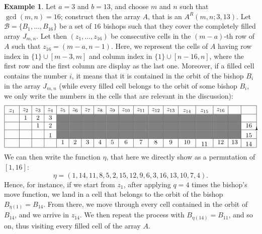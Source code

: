 \documentclass{amsart}
\theoremstyle{definition}
\newtheorem{ex}[prop]{Example}
\numberwithin{equation}{section}
\newcommand\tikzmark[2]{%
\tikz[remember picture,baseline] \node[inner sep=2pt,outer sep=0] (#1){#2};%
}
\newcommand\link[2]{%
\begin{tikzpicture}[remember picture, overlay, >=stealth, shift={(0,0)}]
  \draw[->] (#1) to (#2);
\end{tikzpicture}%
}
\begin{document}
\begin{ex}
Let $a = 3$ and $b=13$, and choose $m$ and $n$ such that $\gcd(m,n) = 16$; construct then the array $A$, that is an $A^{R}(m,n;3,13)$. Let $\mathcal{B} = \{B_1, \dotsc, B_{16}\}$ be a set of $16$ bishops such that they cover the completely filled array $J_{m,n}$. Let then $(z_1,\dotsc,z_{16})$ be consecutive cells in the $(m-a)$-th row of $A$ such that $z_{16} = (m-a,n-1)$. Here, we represent the cells of $A$ having row index in $\{1\} \cup [m-3,m]$ and column index in $\{1\} \cup [n-16,n]$, where the first row and the first column are display as the last one. Moreover, if a filled cell contains the number $i$, it means that it is contained in the orbit of the bishop $B_i$ in the array $J_{m,n}$ (while every filled cell belongs to the orbit of some bishop $B_i$, we only write the numbers in the cells that are relevant in the discussion):
\[
\small{
\begin{array}{|c|c|c|c|c|c|c|c|c|c|c|c|c|c|c|c|c|c|} \hline
\tikzmark{p}{$z_1$}&z_2&z_3&z_4&z_5&z_6&z_7&z_8&z_9&z_{10}&z_{11}&z_{12}&z_{13}&\tikzmark{d}{$z_{14}$}&\tikzmark{e}{$z_{15}$}&z_{16} && \\ \hline
&1&2&3&\cellcolor{gray}&\cellcolor{gray}&\cellcolor{gray}&\cellcolor{gray}&\cellcolor{gray}&\cellcolor{gray}&\cellcolor{gray}&\cellcolor{gray}&\cellcolor{gray}&\cellcolor{gray}&\cellcolor{gray}&\cellcolor{gray}&\cellcolor{gray}& \\ \hline
&&1&2&\cellcolor{gray}&\cellcolor{gray}&\cellcolor{gray}&\cellcolor{gray}&\cellcolor{gray}&\cellcolor{gray}&\cellcolor{gray}&\cellcolor{gray}&\cellcolor{gray}&\cellcolor{gray}&\cellcolor{gray}&\cellcolor{gray}&\cellcolor{gray}&16 \\ \hline
&&&\tikzmark{a}{1}&\cellcolor{gray}&\cellcolor{gray}&\cellcolor{gray}&\cellcolor{gray}&\cellcolor{gray}&\cellcolor{gray}&\cellcolor{gray}&\cellcolor{gray}&\cellcolor{gray}&\cellcolor{gray}&\cellcolor{gray}&\cellcolor{gray}&\cellcolor{gray}& \tikzmark{b}{15} \\ \hline
&&&&1&2&3&4&5&6&7&8&9&10&\tikzmark{f}{11} &12&13&\tikzmark{c}{14} \\ \hline
\end{array}
\link{a}{b}
\link{b}{c}
\link{d}{e}
\link{e}{f}
}
\]
We can then write the function $\eta$, that here we directly show as a permutation of $[1,16]$:
\[
\eta = (1,14,11,8,5,2,15,12,9,6,3,16,13,10,7,4).
\]
Hence, for instance, if we start from $z_1$, after applying $q=4$ times the bishop's move function, we land in a cell that belongs to the orbit of the bishop $B_{\eta(1)} = B_{14}$. From there, we move through every cell contained in the orbit of $B_{14}$, and we arrive in $z_{14}$. We then repeat the process with $B_{\eta(14)}=B_{11}$, and so on, thus visiting every filled cell of the array $A$.
\end{ex}
\end{document}
